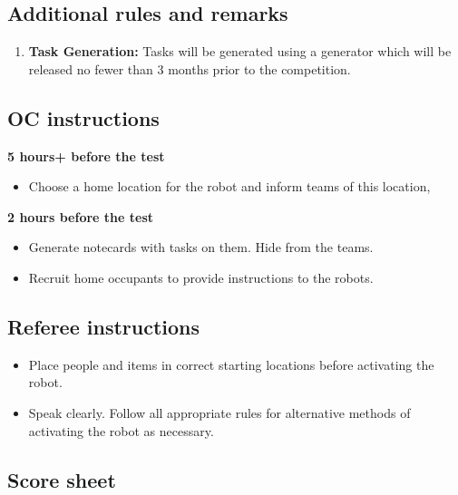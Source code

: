 %
%
\subsection{Additional rules and remarks}
\begin{enumerate}
	\item \textbf{Task Generation:}  Tasks will be generated using a generator which will be released no fewer than 3 months prior to the competition.
\end{enumerate}

\newpage
\subsection{OC instructions}

\textbf{5 hours+ before the test}
\begin{itemize}
	\item Choose a home location for the robot and inform teams of this location,
\end{itemize}

\textbf{2 hours before the test}
\begin{itemize}
	\item Generate notecards with tasks on them. Hide from the teams.
	\item Recruit home occupants to provide instructions to the robots.
\end{itemize}

\subsection{Referee instructions}
\begin{itemize}
	\item Place people and items in correct starting locations before activating the robot.
	\item Speak clearly. Follow all appropriate rules for alternative methods of activating the robot as necessary.
\end{itemize}


\newpage
\subsection{Score sheet}


